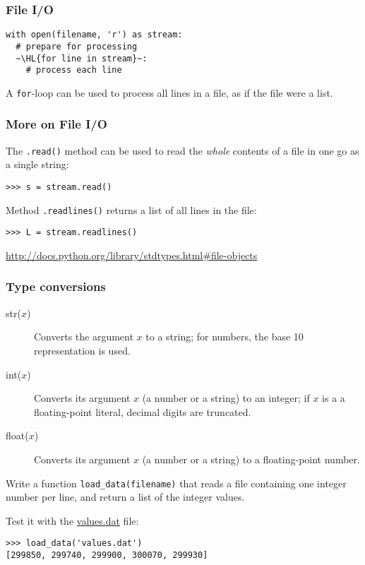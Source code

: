 \documentclass[english,serif,mathserif,xcolor=pdftex,dvipsnames,table]{beamer}
\begin{document}
\begin{frame}[fragile]
  \frametitle{File I/O}

\begin{lstlisting}
with open(filename, 'r') as stream:
  # prepare for processing
  ~\HL{for line in stream}~:
    # process each line
\end{lstlisting}

  \+ A \texttt{for}-loop can be used to process all lines in a file, as if the
  file were a list.
\end{frame}


\begin{frame}[fragile]
  \frametitle{More on File I/O}

  The \lstinline|.read()| method can be used to read the \emph{whole} contents
  of a file in one go as a single string:
\begin{lstlisting}
>>> s = stream.read()
\end{lstlisting}

  \+
  Method \lstinline|.readlines()| returns a list of all lines in the file:
\begin{lstlisting}
>>> L = stream.readlines()
\end{lstlisting}

  \begin{references}
    \url{http://docs.python.org/library/stdtypes.html#file-objects}
  \end{references}
\end{frame}


\begin{frame}[fragile,label=typeconv]
  \frametitle{Type conversions}
  \begin{description}
  \item[str($x$)] Converts the argument $x$ to a string; for numbers,
    the base 10 representation is used.
  \item[int($x$)] Converts its argument $x$ (a number or a string) to an integer;
    if $x$ is a a floating-point literal, decimal digits are truncated.
  \item[float($x$)] Converts its argument $x$ (a number or a string) to a
    floating-point number.
  \end{description}
\end{frame}


\begin{frame}[fragile]
  \begin{exercise*}[4.A]
    Write a function \lstinline|load_data(filename)| that reads a file
    containing one integer number per line, and return a list of the
    integer values.

    \+
    Test it with the
    \href{https://raw.github.com/gc3-uzh-ch/python-course/master/values.dat}{values.dat}
    file:
\begin{lstlisting}
>>> load_data('values.dat')
[299850, 299740, 299900, 300070, 299930]
\end{lstlisting}
  \end{exercise*}
\end{frame}
\end{document}
